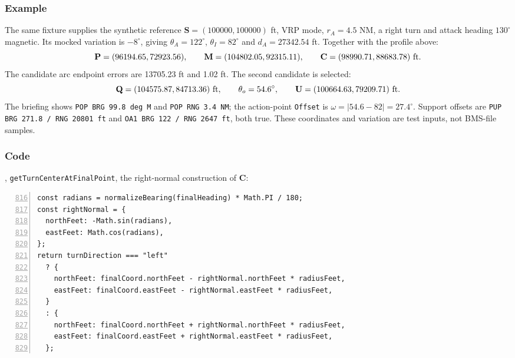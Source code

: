 \documentclass[10pt,a4paper]{amsart}
\begin{document}
\subsubsection*{Example}
The same  fixture supplies the
synthetic reference $\mathbf S=(100000,100000)$ ft, VRP mode,
$r_A=4.5$ NM, a right turn and attack heading $130^\circ$ magnetic.
Its mocked variation is $-8^\circ$, giving
$\theta_A=122^\circ$, $\theta_I=82^\circ$ and $d_A=27342.54$ ft.
Together with the profile above:
\[
 \mathbf P=(96194.65,72923.56),\qquad
 \mathbf M=(104802.05,92315.11),\qquad
 \mathbf C=(98990.71,88683.78)\ {\rm ft}.
\]
The candidate arc endpoint errors are 13705.23 ft and 1.02 ft.
The second candidate is selected:
\[
 \mathbf Q=(104575.87,84713.36)\ {\rm ft},\qquad
 \theta_o=54.6^\circ,\qquad
 \mathbf U=(100664.63,79209.71)\ {\rm ft}.
\]
The briefing shows \texttt{POP BRG 99.8 deg M} and
\texttt{POP RNG 3.4 NM}; the action-point \texttt{Offset} is
$\omega=|54.6-82|=27.4^\circ$. Support offsets are
\texttt{PUP BRG 271.8 / RNG 20801 ft} and
\texttt{OA1 BRG 122 / RNG 2647 ft}, both true.
These coordinates and variation are test inputs, not BMS-file samples.

\subsubsection*{Code}
, \texttt{getTurnCenterAtFinalPoint},
the right-normal construction of $\mathbf C$:
\begin{lstlisting}[numbers=left,firstnumber=816,numberstyle=\tiny,xleftmargin=2em]
const radians = normalizeBearing(finalHeading) * Math.PI / 180;
const rightNormal = {
  northFeet: -Math.sin(radians),
  eastFeet: Math.cos(radians),
};
return turnDirection === "left"
  ? {
    northFeet: finalCoord.northFeet - rightNormal.northFeet * radiusFeet,
    eastFeet: finalCoord.eastFeet - rightNormal.eastFeet * radiusFeet,
  }
  : {
    northFeet: finalCoord.northFeet + rightNormal.northFeet * radiusFeet,
    eastFeet: finalCoord.eastFeet + rightNormal.eastFeet * radiusFeet,
  };
\end{lstlisting}
\end{document}
